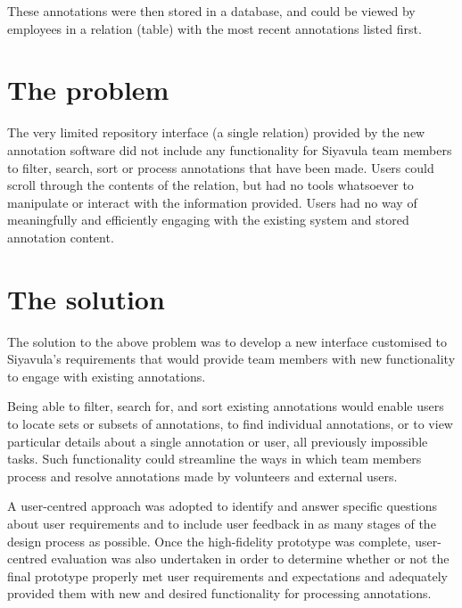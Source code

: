 These annotations were then stored in a database, and could be viewed by employees in a relation (table) with the most recent annotations listed first. 

\section{The problem}
The very limited repository interface (a single relation) provided by the new annotation software did not include any functionality for Siyavula team members to filter, search, sort or process annotations that have been made. Users could scroll through the contents of the relation, but had no tools whatsoever to manipulate or interact with the information provided. Users had no way of meaningfully and efficiently engaging with the existing system and stored annotation content.




\section{The solution}
The solution to the above problem was to develop a new interface customised to Siyavula's requirements that would provide team members with new functionality to engage with existing annotations. 

Being able to filter, search for, and sort existing annotations would enable users to locate sets or subsets of annotations, to find individual annotations, or to view particular details about a single annotation or user, all previously impossible tasks. Such functionality could streamline the ways in which team members process and resolve annotations made by volunteers and external users.

A user-centred approach was adopted to identify and answer specific questions about user requirements and to include user feedback in as many stages of the design process as possible. Once the high-fidelity prototype was complete, user-centred evaluation was also undertaken in order to determine whether or not the final prototype properly met user requirements and expectations and adequately provided them with new and desired functionality for processing annotations. 

